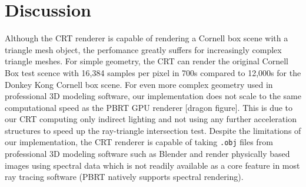 \documentclass[../main.tex]{subfiles}
\begin{document}
\section{Discussion}

Although the CRT renderer is capable of rendering a Cornell box scene with a
triangle mesh object, the perfomance greatly suffers for increasingly complex
triangle meshes. For simple geometry, the CRT can render the original Cornell Box
test scence with 16,384 samples per pixel in 700s compared to 12,000s for the
Donkey Kong Cornell box scene. For even more complex geometry used in professional
3D modeling software, our implementation does not scale to the same computational
speed as the PBRT GPU renderer [dragon figure]. This is due to our CRT computing
only indirect lighting and not using any further acceleration structures to speed up the
ray-triangle intersection test. Despite the limitations of our implementation, the CRT
renderer is capable of taking \texttt{.obj} files from professional 3D modeling software
such as Blender and render physically based images using spectral data which is not readily
available as a core feature in most ray tracing software (PBRT natively supports spectral
rendering).

\ifSubfilesClassLoaded{%
    \nocite{*}
    \twocolumn
}{}
\end{document}

